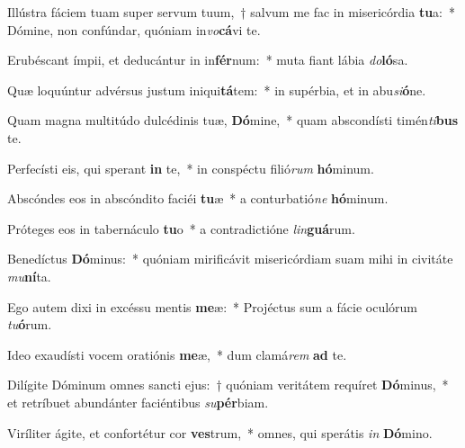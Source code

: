 \item Illústra fáciem tuam super servum tuum,~† salvum me fac in misericórdia \textbf{tu}a:~* Dómine, non confúndar, quóniam in\textit{vo}\textbf{cá}vi te.
\item Erubéscant ímpii, et deducántur in in\textbf{fér}num:~* muta fiant lábia \textit{do}\textbf{ló}sa.
\item Quæ loquúntur advérsus justum iniqui\textbf{tá}tem:~* in supérbia, et in abu\textit{si}\textbf{ó}ne.
\item Quam magna multitúdo dulcédinis tuæ, \textbf{Dó}mine,~* quam abscondísti timén\textit{ti}\textbf{bus} te.
\item Perfecísti eis, qui sperant \textbf{in} te,~* in conspéctu filió\textit{rum} \textbf{hó}minum.
\item Abscóndes eos in abscóndito faciéi \textbf{tu}æ~* a conturbatió\textit{ne} \textbf{hó}minum.
\item Próteges eos in tabernáculo \textbf{tu}o~* a contradictióne \textit{lin}\textbf{guá}rum.
\item Benedíctus \textbf{Dó}minus:~* quóniam mirificávit misericórdiam suam mihi in civitáte \textit{mu}\textbf{ní}ta.
\item Ego autem dixi in excéssu mentis \textbf{me}æ:~* Projéctus sum a fácie oculórum \textit{tu}\textbf{ó}rum.
\item Ideo exaudísti vocem oratiónis \textbf{me}æ,~* dum clamá\textit{rem} \textbf{ad} te.
\item Dilígite Dóminum omnes sancti ejus:~† quóniam veritátem requíret \textbf{Dó}minus,~* et retríbuet abundánter faciéntibus \textit{su}\textbf{pér}biam.
\item Viríliter ágite, et confortétur cor \textbf{ves}trum,~* omnes, qui sperátis \textit{in} \textbf{Dó}mino.
